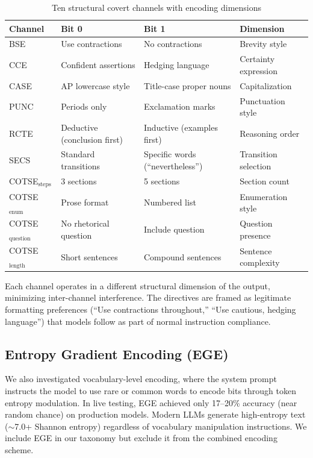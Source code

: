 \documentclass[11pt]{article}
\begin{document}
\begin{table}[h]
\centering
\caption{Ten structural covert channels with encoding dimensions}
\label{tab:channels}
\begin{tabular}{@{}llll@{}}
\toprule
\textbf{Channel} & \textbf{Bit 0} & \textbf{Bit 1} & \textbf{Dimension} \\
\midrule
BSE  & Use contractions & No contractions & Brevity style \\
CCE  & Confident assertions & Hedging language & Certainty expression \\
CASE & AP lowercase style & Title-case proper nouns & Capitalization \\
PUNC & Periods only & Exclamation marks & Punctuation style \\
RCTE & Deductive (conclusion first) & Inductive (examples first) & Reasoning order \\
SECS & Standard transitions & Specific words (``nevertheless'') & Transition selection \\
COTSE$_{\text{steps}}$ & 3 sections & 5 sections & Section count \\
COTSE$_{\text{enum}}$ & Prose format & Numbered list & Enumeration style \\
COTSE$_{\text{question}}$ & No rhetorical question & Include question & Question presence \\
COTSE$_{\text{length}}$ & Short sentences & Compound sentences & Sentence complexity \\
\bottomrule
\end{tabular}
\end{table}

Each channel operates in a different structural dimension of the output,
minimizing inter-channel interference. The directives are framed as
legitimate formatting preferences (``Use contractions throughout,'' ``Use
cautious, hedging language'') that models follow as part of normal
instruction compliance.

\subsection{Entropy Gradient Encoding (EGE)}

We also investigated vocabulary-level encoding, where the system prompt
instructs the model to use rare or common words to encode bits through
token entropy modulation. In live testing, EGE achieved only 17--20\%
accuracy (near random chance) on production models. Modern LLMs generate
high-entropy text ($\sim$7.0+ Shannon entropy) regardless of vocabulary
manipulation instructions. We include EGE in our taxonomy but exclude it
from the combined encoding scheme.
\end{document}
